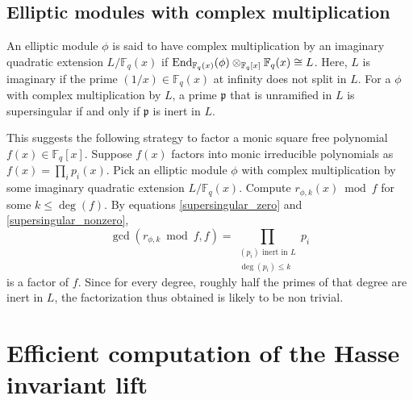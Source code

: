\documentclass[12pt]{article}
\theoremstyle{plain}
\theoremstyle{definition}
\DeclareMathOperator{\End}{{\rm End}} %
\def\F{\ensuremath{\mathbb{F}}}
\newcommand{\p}{\mathfrak p}
\begin{document}
\subsection{Elliptic modules with complex multiplication}
\label{randomized_section}

An elliptic module $\phi$ is said to have complex multiplication by an imaginary quadratic 
extension $L/\F_q(x)$ if $\End_{\F_q(x)}(\phi)\otimes_{\F_q[x]} \F_q(x) \cong L$. Here, $L$ is 
imaginary if the prime $(1/x) \in \F_q(x)$ at infinity does not split in $L$. For a $\phi$ with 
complex multiplication by $L$, a prime $\p$ that is unramified in $L$ is supersingular if and
only if $\p$ is inert in $L$.

This suggests the following strategy to factor a monic square free polynomial $f(x) \in \F_q[x]$. 
Suppose $f(x)$ factors into monic irreducible polynomials as $f(x) = \prod_i p_i(x)$. Pick an 
elliptic module $\phi$ with complex multiplication by some imaginary quadratic extension 
$L/\F_q(x)$. Compute $r_{\phi,k}(x) \bmod f$ for some $k \le \deg(f)$. By equations 
\eqref{supersingular_zero} and \eqref{supersingular_nonzero}, 
\[\gcd(r_{\phi,k} \bmod f, f) = \prod_{\substack{(p_i) \text{ inert in } L \\ \deg(p_i) \le k}} 
p_i \]
is a factor of $f$. Since for every degree, roughly half the primes of that degree are inert in 
$L$, the factorization thus obtained is likely to be non trivial.


 
 
\section{Efficient computation of the Hasse invariant lift}
\label{sec:hasse}
\end{document}
